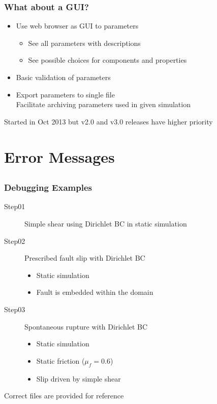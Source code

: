 \documentclass[aspectration=169]{beamer}
\begin{document}
\begin{frame}
  \frametitle{What about a GUI?}

  \begin{itemize}
  \item Use web browser as GUI to parameters
    \begin{itemize}
    \item See all parameters with descriptions
    \item See possible choices for components and properties
    \end{itemize}
  \item Basic validation of parameters
  \item Export parameters to single file\\
    Facilitate archiving parameters used in given simulation
  \end{itemize}

  \vfill
  Started in Oct 2013 but v2.0 and v3.0 releases have higher priority
  
\end{frame}


\section{Error Messages}
\subsection{}

\begin{frame}
  \frametitle{Debugging Examples}

  \begin{description}
  \item[Step01] Simple shear using Dirichlet BC in static simulation
  \item[Step02] Prescribed fault slip with Dirichlet BC
    \begin{itemize}
    \item Static simulation
    \item Fault is embedded within the domain
    \end{itemize}
  \item[Step03] Spontaneous rupture with Dirichlet BC
    \begin{itemize}
    \item Static simulation
    \item Static friction ($\mu_f=0.6$)
    \item Slip driven by simple shear
    \end{itemize}
  \end{description}
  \vfill
  Correct files are provided for reference
  
\end{frame}
\end{document}
